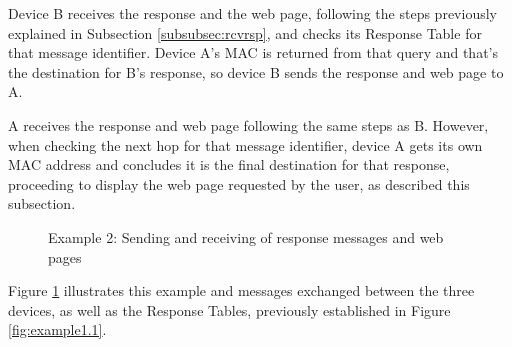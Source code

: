Device B receives the response and the web page, following the steps previously explained in Subsection \ref{subsubsec:rcvrsp}, and checks its Response Table for that message identifier. Device A's \gls{MAC} is returned from that query and that's the destination for B's response, so device B sends the response and web page to A.

A receives the response and web page following the same steps as B. However, when checking the next hop for that message identifier, device A gets its own \gls{MAC} address and concludes it is the final destination for that response, proceeding to display the web page requested by the user, as described this subsection.

\begin{figure}[ht]
   \noindent{}
	\caption{\label{fig:example1.2} Example 2: Sending and receiving of response messages and web pages}
\end{figure}

Figure \ref{fig:example1.2} illustrates this example and messages exchanged between the three devices, as well as the Response Tables, previously established in Figure \ref{fig:example1.1}.











